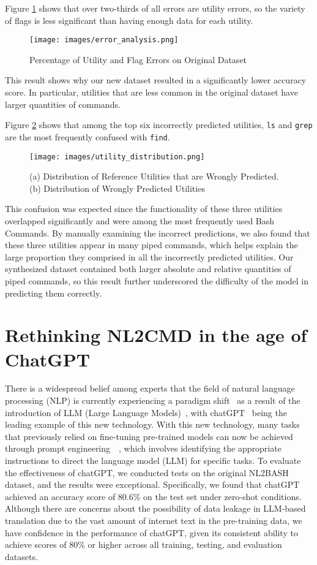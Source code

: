 \documentclass{river-journal}
\begin{document}
Figure \ref{fig:err2} shows that over two-thirds of all errors are utility errors, so the variety of flags is less significant than having enough data for each utility.
\begin{figure}[hbpt]
\centering
\texttt{[image: images/error\_analysis.png]}
\caption{Percentage of Utility and Flag Errors on Original Dataset}
\label{fig:err2}
\end{figure}
This result shows why our new dataset resulted in a significantly lower accuracy score. In particular, utilities that are less common in the original dataset have larger quantities of commands.

Figure \ref{fig:utility} shows that among the top six incorrectly predicted utilities, \texttt{ls} and \texttt{grep} are the most frequently confused with \texttt{find}. 
\begin{figure}[hbpt]
\centering
\texttt{[image: images/utility\_distribution.png]}
\caption{(a) Distribution of Reference Utilities that are Wrongly Predicted. (b) Distribution of Wrongly Predicted Utilities}
\label{fig:utility}
\end{figure}
This confusion was expected since the functionality of these three utilities overlapped significantly and were among the most frequently used Bash Commands. By manually examining the incorrect predictions, we also found that these three utilities appear in many piped commands, which helps explain the large proportion they comprised in all the incorrectly predicted utilities. Our synthesized dataset contained both larger absolute and relative quantities of piped commands, so this result further underscored the difficulty of the model in predicting them correctly.

\section{Rethinking NL2CMD in the age of ChatGPT}
\label{rethink}
There is a widespread belief among experts that the field of natural language processing (NLP) is currently experiencing a paradigm shift~\cite{liu2023pre} as a result of the introduction of LLM (Large Language Models)~\cite{bommasani2021opportunities}, with chatGPT~\cite{bang2023multitask} being the leading example of this new technology. With this new technology, many tasks that previously relied on fine-tuning pre-trained models can now be achieved through prompt engineering~\cite{white2023prompt}~\cite{white2023chatgpt}, which involves identifying the appropriate instructions to direct the language model (LLM) for specific tasks. To evaluate the effectiveness of chatGPT, we conducted tests on the original NL2BASH dataset, and the results were exceptional. Specifically, we found that chatGPT achieved an accuracy score of 80.6\% on the test set under zero-shot conditions. Although there are concerns about the possibility of data leakage in LLM-based translation due to the vast amount of internet text in the pre-training data, we have confidence in the performance of chatGPT, given its consistent ability to achieve scores of 80\% or higher across all training, testing, and evaluation datasets.
\end{document}
